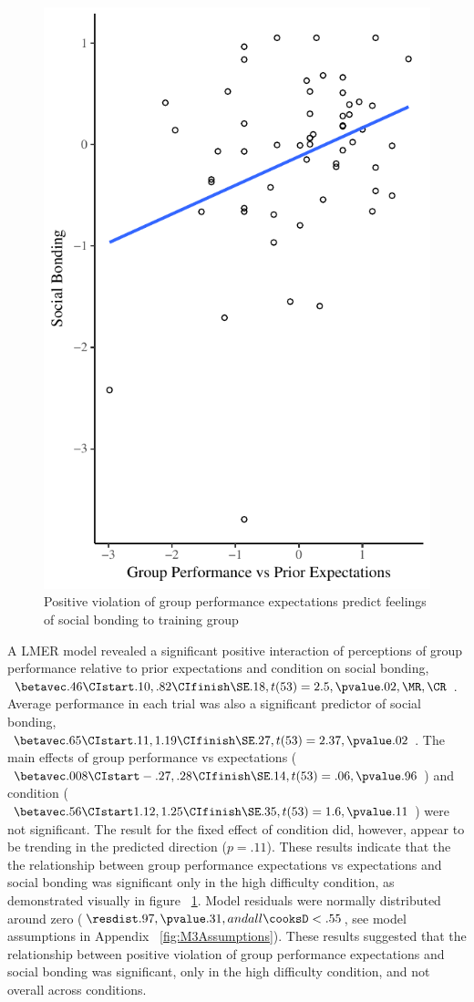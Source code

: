 
\begin{figure}
  \centering
  \includegraphics[width=0.5\linewidth,keepaspectratio] {images/groupPerfExpBondConditionScatter}
  \caption{Positive violation of group performance expectations
 predict feelings of social bonding to training group}
 \label{fig:groupPerfExpBondConditionScatter}
\end{figure}

A LMER model revealed a significant positive interaction of perceptions of group performance relative to prior expectations and condition on social bonding, $\betavec .46 \CIstart .10, .82 \CIfinish \SE .18, t(53) = 2.5, \pvalue .02, \MR , \CR $.  Average performance in each trial was also a significant predictor of social bonding, $\betavec .65 \CIstart .11, 1.19 \CIfinish \SE .27, t(53) = 2.37, \pvalue .02$.
The main effects of group performance vs expectations ($\betavec .008  \CIstart -.27, .28 \CIfinish \SE .14, t(53) = .06, \pvalue .96$) and condition ($\betavec .56  \CIstart 1.12, 1.25 \CIfinish \SE .35, t(53) = 1.6, \pvalue .11$) were not significant. The result for the fixed effect of condition did, however, appear to be trending in the predicted direction ($p = .11$). These results indicate that the the relationship between group performance expectations vs expectations and social bonding was significant only in the high difficulty condition, as demonstrated visually in figure ~\ref{fig:groupPerfExpBondConditionScatter}.
Model residuals were normally distributed around zero ($\resdist .97, \pvalue .31, and all \cooksD < .55$, see model assumptions in Appendix  ~\ref{fig:M3Assumptions}).  These results suggested that the relationship between positive violation of group performance expectations and social bonding was significant, only in the high difficulty condition, and not overall across conditions.









